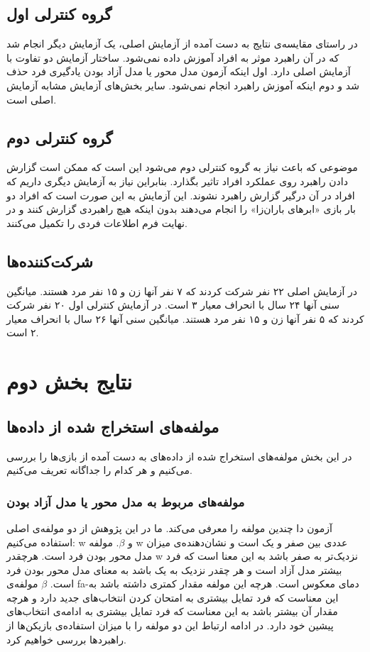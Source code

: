 \documentclass[twoside, a4paper,11pt]{book}
\numberwithin{equation}{chapter}
\numberwithin{table}{chapter}
\numberwithin{figure}{chapter}
\numberwithin{equation}{chapter}
\newcommand{\mls}[1]{\gls{fa-#1}\glsuseri{la-#1}}
\begin{document}
\subsection{گروه کنترلی اول}

در راستای مقایسه‌ی نتایج به دست آمده از آزمایش اصلی، یک آزمایش دیگر انجام شد که در آن راهبرد موثر به افراد آموزش داده نمی‌شود. ساختار آزمایش دو تفاوت با آزمایش اصلی دارد. اول اینکه آزمون مدل محور یا مدل آزاد بودن یادگیری فرد حذف شد و دوم اینکه آموزش راهبرد انجام نمی‌شود. سایر بخش‌های آزمایش مشابه آزمایش اصلی است.

\subsection{گروه کنترلی دوم}

موضوعی که باعث نیاز به گروه کنترلی دوم می‌شود این است که ممکن است گزارش دادن راهبرد روی عملکرد افراد تاثیر بگذارد. بنابراین نیاز به آزمایش دیگری داریم که افراد در آن درگیر گزارش راهبرد نشوند. این آزمایش به این صورت است که افراد دو بار بازی «ابرهای باران‌زا» را انجام می‌دهند بدون اینکه هیچ راهبردی گزارش کنند و در نهایت فرم اطلاعات فردی را تکمیل می‌کنند.

\subsection{شرکت‌کننده‌ها}

در آزمایش اصلی ۲۲ نفر شرکت کردند که ۷ نفر آنها زن و ۱۵ نفر مرد هستند. میانگین سنی آنها ۲۴ سال با انحراف معیار ۳ است. در آزمایش کنترلی اول ۲۰ نفر شرکت کردند که ۵ نفر آنها زن و ۱۵ نفر مرد هستند. میانگین سنی آنها ۲۶ سال با انحراف معیار ۲ است. 

\section{نتایج بخش دوم}

\subsection{مولفه‌های استخراج شده از داده‌ها}
در این بخش مولفه‌های استخراج شده از داده‌های به دست آمده از بازی‌ها را بررسی می‌کنیم و هر کدام را جداگانه تعریف می‌کنیم.
\subsubsection{مولفه‌های مربوط به مدل محور یا مدل آزاد بودن}

آزمون دا چندین مولفه را معرفی می‌کند. ما در این پژوهش از دو مولفه‌ی اصلی استفاده می‌کنیم: w و $\beta$. مولفه w عددی بین صفر و یک است و نشان‌دهنده‌ی میزان مدل محور بودن فرد است. هرچقدر w نزدیک‌تر به صفر باشد به این معنا است که فرد بیشتر مدل آزاد است و هر چقدر نزدیک به یک باشد به معنای مدل محور بودن فرد است. $\beta$ مولفه‌ی \mls{دمای معکوس} است. هرچه این مولفه مقدار کمتری داشته باشد به این معناست که فرد تمایل بیشتری به امتحان کردن انتخاب‌های جدید دارد و هرچه مقدار آن بیشتر باشد به این معناست که فرد تمایل بیشتری به ادامه‌ی انتخاب‌های پیشین خود دارد. در ادامه ارتباط این دو مولفه را با میزان استفاده‌ی بازیکن‌ها از راهبردها بررسی خواهیم کرد. 
\end{document}
